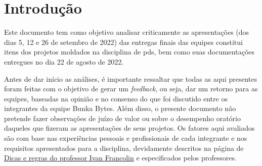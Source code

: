 \chapter{Introdução}
Este documento tem como objetivo analisar criticamente as apresentações (dos dias 5, 12 e 26 de setembro de 2022) das entregas finais das equipes constitui itens dos projetos moldados na disciplina de \acs{pds}, bem como suas documentações entregues no dia 22 de agosto de 2022.

Antes de dar início as análises, é importante ressaltar que todas as aqui presentes foram feitas com o objetivo de gerar um \textsl{feedback}, ou seja, dar um retorno para as equipes, baseadas na opinião e no consenso do que foi discutido entre os integrantes da equipe Bunka Bytes. Além disso, o presente documento não pretende fazer observações de juízo de valor ou sobre o desempenho oratório daqueles que fizeram as apresentações de seus projetos. Os fatores aqui avaliados são com base nas experiências pessoais e profissionais de cada integrante e nos requisitos apresentados para a disciplina, devidamente descritos na página de \href{https://dicas.ivanfm.com/aulas/pds.html}{Dicas e regras do professor Ivan Francolin} e especificados pelos professores.